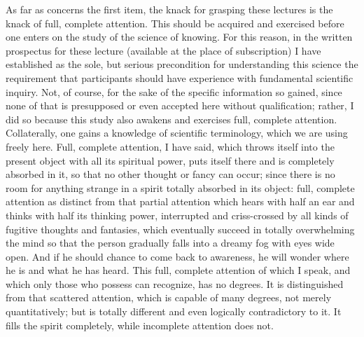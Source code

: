 As far as concerns the first item,
the knack for grasping these lectures is
the knack of full, complete attention.
This should be acquired and exercised
before one enters on the study of the science of knowing.
For this reason, in the written prospectus for these lecture
(available at the place of subscription)
I have established as the sole, but serious precondition
for understanding this science the requirement
that participants should have experience with
fundamental scientific inquiry.
Not, of course, for the sake of
the specific information so gained,
since none of that is presupposed
or even accepted here without qualification;
rather, I did so because this study also
awakens and exercises full, complete attention.
Collaterally, one gains a knowledge of scientific terminology,
which we are using freely here.
Full, complete attention, I have said,
which throws itself into the present object
with all its spiritual power,
puts itself there and is completely absorbed in it,
so that no other thought or fancy can occur;
since there is no room for anything strange
in a spirit totally absorbed in its object:
full, complete attention as distinct
from that partial attention
which hears with half an ear
and thinks with half its thinking power,
interrupted and criss-crossed by
all kinds of fugitive thoughts and fantasies,
which eventually succeed in totally overwhelming
the mind so that the person gradually falls
into a dreamy fog with eyes wide open.
And if he should chance to come back to awareness,
he will wonder where he is and what he has heard.
This full, complete attention of which I speak,
and which only those who possess can recognize, has no degrees.
It is distinguished from that scattered attention,
which is capable of many degrees, not merely quantitatively;
but is totally different and even logically contradictory to it.
It fills the spirit completely,
while incomplete attention does not.

